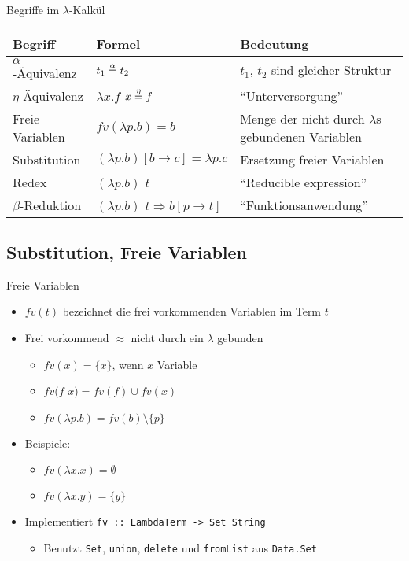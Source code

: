 \documentclass{beamer}
\begin{document}

\begin{frame}{Begriffe im $\lambda$-Kalkül}
	\fontsize{9pt}{13}\selectfont

	\begin{tabularx}{\textwidth}{ s | X | X }
		\textbf{Begriff} & \textbf{Formel} & \textbf{Bedeutung} \\
		\hline
		$\alpha$-Äquivalenz & $t_1 \stackrel{\alpha}{=} t_2$ & $t_1$, $t_2$ sind gleicher Struktur \\
		\hline
		$\eta$-Äquivalenz & $\lambda{}x.f$ $x \stackrel{\eta}{=} f$ & \enquote{Unterversorgung} \\
		\hline
		Freie Variablen & $fv(\lambda{}p.b) = { b }$ & Menge der nicht durch $\lambda$s gebundenen Variablen \\
		\hline
		Substitution & $(\lambda{}p.b)\left[b\rightarrow{}c\right]=\lambda{}p.c$ & Ersetzung freier Variablen \\
		\hline
		Redex & $(\lambda{}p.b)$ $t$ & \enquote{Reducible expression} \\
		\hline
		$\beta$-Reduktion & $(\lambda{}p.b)$ $t \Rightarrow b\left[p\rightarrow{}t\right]$ & \enquote{Funktionsanwendung} \\
	\end{tabularx}
\end{frame}

\subsection{Substitution, Freie Variablen}

\begin{frame}{Freie Variablen}
	\begin{itemize}
		\item $fv(t)$ bezeichnet die frei vorkommenden Variablen im Term $t$
		\item Frei vorkommend $\approx$ nicht durch ein $\lambda$ gebunden
		\begin{itemize}
			\item $fv(x) = \{x\}$, wenn $x$ Variable
			\item $fv(f$ $x) = fv(f) \cup fv(x)$
			\item $fv(\lambda{}p.b) = fv(b) \setminus \{p\}$
		\end{itemize}
		\item Beispiele:
		\begin{itemize}
			\item $fv(\lambda{}x.x) = \emptyset$
			\item $fv(\lambda{}x.y) = \{y\}$
		\end{itemize}
		\pause
		\item Implementiert \texttt{fv :: LambdaTerm -> Set String}
		\begin{itemize}
			\item Benutzt \texttt{Set}, \texttt{union}, \texttt{delete} und \texttt{fromList} aus \texttt{Data.Set}
		\end{itemize}
	\end{itemize}
\end{frame}
\end{document}
